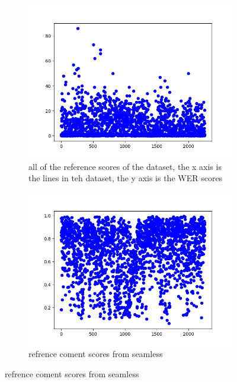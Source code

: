 \begin{figure}[ht]
    \centering
    \begin{subfigure}{0.7\textwidth}
    \includegraphics[width=\linewidth]{Latex/sections/images/seamlesswerref.png}
    \caption{all of the reference scores of the dataset, the x axis is the lines in teh dataset, the y axis is the WER scores}
    \end{subfigure}
    \begin{subfigure}{0.7\textwidth}
        \includegraphics[width=\linewidth]{Latex/sections/images/seamlessreferences.png}
        \caption{refrence coment scores from seamless}
    \end{subfigure}
    \label{fig:reference scatterplot}
\end{figure}



